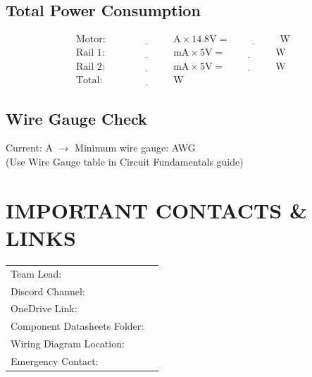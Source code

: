 \documentclass[10pt,letterpaper]{article}
\begin{document}
\subsection*{Total Power Consumption}
\begin{align*}
\text{Motor:} & \quad \underline{\hspace{2cm}} \text{ A} \times 14.8\text{V} = \underline{\hspace{2cm}} \text{ W} \\
\text{Rail 1:} & \quad \underline{\hspace{2cm}} \text{ mA} \times 5\text{V} = \underline{\hspace{2cm}} \text{ W} \\
\text{Rail 2:} & \quad \underline{\hspace{2cm}} \text{ mA} \times 5\text{V} = \underline{\hspace{2cm}} \text{ W} \\
\text{Total:} & \quad \underline{\hspace{2cm}} \text{ W}
\end{align*}

\subsection*{Wire Gauge Check}
Current: \underline{\hspace{2cm}} A $\rightarrow$ Minimum wire gauge: \underline{\hspace{2cm}} AWG\\
(Use Wire Gauge table in Circuit Fundamentals guide)

\section*{IMPORTANT CONTACTS \& LINKS}

\begin{tabularx}{\textwidth}{lX}
Team Lead: & \underline{\hspace{8cm}} \\
Discord Channel: & \underline{\hspace{8cm}} \\
OneDrive Link: & \underline{\hspace{8cm}} \\[0.5em]
Component Datasheets Folder: & \underline{\hspace{8cm}} \\
Wiring Diagram Location: & \underline{\hspace{8cm}} \\[0.5em]
Emergency Contact: & \underline{\hspace{8cm}} \\
\end{tabularx}
\end{document}
